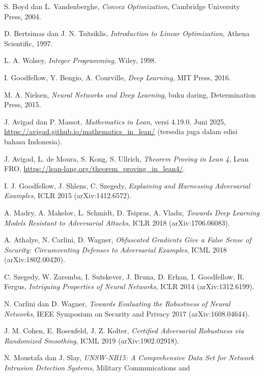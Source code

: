 \begin{sloppypar}
\begin{enumerate}[label={[\arabic*]},leftmargin=1.8em]
  \item S. Boyd dan L. Vandenberghe, \emph{Convex Optimization}, Cambridge
        University Press, 2004.
  \item D. Bertsimas dan J. N. Tsitsiklis, \emph{Introduction to Linear
        Optimization}, Athena Scientific, 1997.
  \item L. A. Wolsey, \emph{Integer Programming}, Wiley, 1998.
  \item I. Goodfellow, Y. Bengio, A. Courville, \emph{Deep Learning},
        MIT Press, 2016.
  \item M. A. Nielsen, \emph{Neural Networks and Deep Learning}, buku daring,
        Determination Press, 2015.
  \item J. Avigad dan P. Massot, \emph{Mathematics in Lean}, versi 4.19.0, Juni
        2025, \url{https://avigad.github.io/mathematics_in_lean/} (tersedia juga
        dalam edisi bahasa Indonesia).
  \item J. Avigad, L. de Moura, S. Kong, S. Ullrich, \emph{Theorem Proving in
        Lean 4}, Lean FRO, \url{https://lean-lang.org/theorem_proving_in_lean4/}.
  \item I. J. Goodfellow, J. Shlens, C. Szegedy, \emph{Explaining and Harnessing
        Adversarial Examples}, ICLR 2015 (arXiv:1412.6572).
  \item A. Madry, A. Makelov, L. Schmidt, D. Tsipras, A. Vladu,
        \emph{Towards Deep Learning Models Resistant to Adversarial Attacks},
        ICLR 2018 (arXiv:1706.06083).
  \item A. Athalye, N. Carlini, D. Wagner, \emph{Obfuscated Gradients Give a
        False Sense of Security: Circumventing Defenses to Adversarial
        Examples}, ICML 2018 (arXiv:1802.00420).
  \item C. Szegedy, W. Zaremba, I. Sutskever, J. Bruna, D. Erhan, I. Goodfellow,
        R. Fergus, \emph{Intriguing Properties of Neural Networks}, ICLR 2014
        (arXiv:1312.6199).
  \item N. Carlini dan D. Wagner, \emph{Towards Evaluating the Robustness of
        Neural Networks}, IEEE Symposium on Security and Privacy 2017
        (arXiv:1608.04644).
  \item J. M. Cohen, E. Rosenfeld, J. Z. Kolter, \emph{Certified Adversarial
        Robustness via Randomized Smoothing}, ICML 2019 (arXiv:1902.02918).
  \item N. Moustafa dan J. Slay, \emph{UNSW-NB15: A Comprehensive Data Set for
        Network Intrusion Detection Systems}, Military Communications and

\end{enumerate}
\end{sloppypar}
